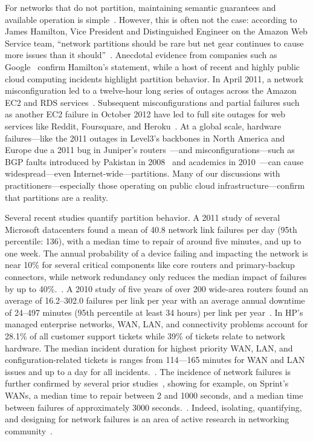 For networks that do not partition, maintaining semantic guarantees
and available operation is
simple~\cite{stonebraker2010errors}. However, this is often not the
case: according to James Hamilton, Vice President and Distinguished
Engineer on the Amazon Web Service team, ``network partitions should
be rare but net gear continues to cause more issues than it
should''~\cite{hamilton-partitions}. Anecdotal evidence from companies
such as Google~\cite{dean-keynote} confirm Hamilton's statement, while
a host of recent and highly public cloud computing incidents highlight
partition behavior. In April 2011, a network misconfiguration led to a
twelve-hour long series of outages across the Amazon EC2 and RDS
services~\cite{amazon-netpartition}. Subsequent misconfigurations and
partial failures such as another EC2 failure in October 2012 have led
to full site outages for web services like Reddit, Foursquare, and
Heroku~\cite{ec2-downsites}. At a global scale, hardware
failures---like the 2011 outages in Level3's backbones in North
America and Europe due a 2011 bug in Juniper's
routers~\cite{juniper-partition}---and misconfigurations---such as BGP
faults introduced by Pakistan in 2008~\cite{pakistan-youtube} and
academics in 2010~\cite{research-experiment-partition}---can cause
widespread---even Internet-wide---partitions. Many of our discussions
with practitioners---especially those operating on public cloud
infrastructure---confirm that partitions are a reality.

Several recent studies quantify partition behavior. A 2011 study of
several Microsoft datacenters found a mean of 40.8 network link
failures per day (95th percentile: 136), with a median time to repair
of around five minutes, and up to one week. The annual probability of
a device failing and impacting the network is near 10\% for several
critical components like core routers and primary-backup connectors,
while network redundancy only reduces the median impact of failures by
up to 40\%.~\cite{sigcomm-dc}. A 2010 study of five years of over 200
wide-area routers found an average of 16.2--302.0 failures per link
per year with an average annual downtime of 24--497 minutes (95th
percentile at least 34 hours) per link per year~\cite{sigcomm-wan}. In
HP's managed enterprise networks, WAN, LAN, and connectivity problems
account for 28.1\% of all customer support tickets while 39\% of
tickets relate to network hardware.  The median incident duration for
highest priority WAN, LAN, and configuration-related tickets is ranges
from 114---165 minutes for WAN and LAN issues and up to a day for all
incidents.~\cite{turner2012failure}. The incidence of network failures
is further confirmed by several prior
studies~\cite{labovitz-failures}, showing for example, on Sprint's
WANs, a median time to repair between 2 and 1000 seconds, and a median
time between failures of approximately 3000
seconds.~\cite{ip-backbone-failures}. Indeed, isolating, quantifying,
and designing for network failures is an area of active research in
networking community~\cite{surviving-failures-bodik,
  uw-failure-networks}.

